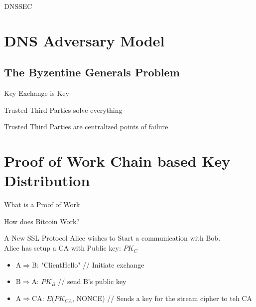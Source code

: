 \documentclass{beamer}
\begin{document}
\begin{frame}{DNSSEC}
\end{frame}

\section{DNS Adversary Model}

\subsection{The Byzentine Generals Problem}

\begin{frame}{Key Exchange is Key}
\end{frame}

\begin{frame}{Trusted Third Parties solve everything}
\end{frame}

\begin{frame}{Trusted Third Parties are centralized points of failure}
\end{frame}

\section{Proof of Work Chain based Key Distribution}

\begin{frame}{What is a Proof of Work}
\end{frame}

\begin{frame}{How does Bitcoin Work?}
\end{frame}

\begin{frame}{A New SSL Protocol}
	Alice wishes to Start a communication with Bob.\\
	Alice has setup a CA with Public key: $PK_{C}$\\
	\begin{itemize}
		\item{ A$\Rightarrow{}$B: "ClientHello" // Initiate exchange} 
		\item{ B$\Rightarrow{}$A: $PK_{B}$ // send B's public key}
		\item{ A$\Rightarrow{}$CA: $E(PK_{CA}$, NONCE) // Sends a key for the stream cipher to teh CA} 
	\end{itemize}


\end{frame}
\end{document}
